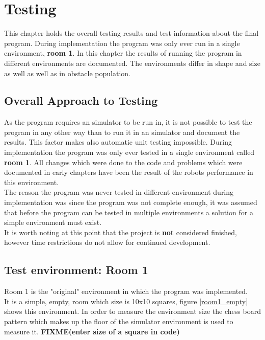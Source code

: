 \chapter{Testing}
\label{Testing}
This chapter holds the overall testing results and test information about the final program.
During implementation the program was only ever run in a single environment, \textbf{room 1}.
In this chapter the results of running the program in different environments are documented. The environments differ in shape and size as well as well as in obstacle population.

\section{Overall Approach to Testing}
As the program requires an simulator to be run in, it is not possible to test the program in any other way than to run it in an simulator and document the results. This factor makes also automatic unit testing impossible. During implementation the program was only ever tested in a single environment called \textbf{room 1}. All changes which were done to the code and problems which were documented in early chapters have been the result of the robots performance in this environment. \\[3ex]

The reason the program was never tested in different environment during implementation was since the program was not complete enough, it was assumed that before the program can be tested in multiple environments a solution for a simple environment must exist.\\
It is worth noting at this point that the project is \textbf{not} considered finished, however time restrictions do not allow for continued development. 

\section{Test environment: Room 1}
\label{room1}
Room 1 is the "original" environment in which the program was implemented. \\
It is a simple, empty, room which size is 10x10 squares, figure \ref{room1_empty} shows this environment. In order to measure the environment size the chess board pattern which makes up the floor of the simulator environment is used to measure it. \textbf{FIXME(enter size of a square in code)}\\

